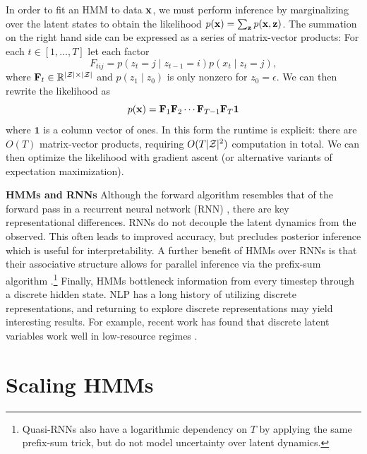 \documentclass[11pt,a4paper]{article}
\begin{document}
In order to fit an HMM to data $\mathbf{x}$,
we must perform inference by marginalizing over the latent states to obtain the likelihood
$p(\mathbf{x}) = \sum_{\mathbf{z}}p(\mathbf{x},\mathbf{z})$.
The summation on the right hand side can be expressed as a series of matrix-vector products:
For each $t \in [1, \ldots, T]$ let each factor
\begin{equation}
\label{eqn:factors}
F_{tij} = p(z_t = j \mid z_{t-1} = i) p(x_t \mid z_t = j),
\end{equation}
where $\mathbf{F}_t\in\mathbb{R}^{|\mathcal{Z}|\times|\mathcal{Z}|}$ and $p(z_1 \mid z_0)$ is only nonzero for $z_0 = \epsilon$.
We can then rewrite the likelihood as
\begin{equation}
\label{eqn:mat_ev}
p(\mathbf{x}) = \mathbf{F}_1 \mathbf{F}_2 \cdots \mathbf{F}_{T-1}\mathbf{F}_{T}\mathbf{1}
\end{equation}
where $\mathbf{1}$ is a column vector of ones.
In this form the runtime is explicit: there are $O(T)$ matrix-vector products,
requiring $O(T |\mathcal{Z}|^2)$ computation in total.
We can then optimize the likelihood 
with gradient ascent (or alternative variants of expectation maximization).

\noindent \textbf{HMMs and RNNs}
Although the forward algorithm resembles that of the forward pass in a recurrent neural network (RNN)
\citep{buys2018hmm}, there are key representational differences.
RNNs do not decouple the latent dynamics from the observed.
This often leads to improved accuracy,
but precludes posterior inference which is useful for interpretability.
A further benefit of HMMs over RNNs is that
their associative structure allows for parallel inference
via the prefix-sum algorithm \cite{ladner1980prefix}.\footnote{
Quasi-RNNs \citep{bradbury2016qrnn} also have a logarithmic dependency on $T$
by applying the same prefix-sum trick, but do not model uncertainty over
latent dynamics.}
Finally, HMMs bottleneck information from every timestep through a discrete hidden state. 
NLP has a long history of utilizing discrete representations,
and returning to explore discrete representations may yield interesting results.
For example, recent work has found that discrete latent variables
work well in low-resource regimes \citep{jin2020discrete}.


\section{Scaling HMMs}
\label{sec:methods}
\end{document}
